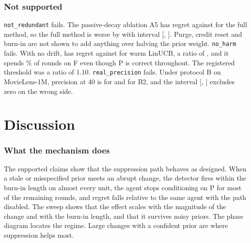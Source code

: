 \subsubsection*{Not supported}
\texttt{not\_redundant} fails. The passive-decay ablation A5 has regret \redRegretAfive{} against \redRegretDES{} for the full method, so the full method is worse by \redDiff{} with interval [\redLo, \redHi]. Purge, credit reset and burn-in are not shown to add anything over halving the prior weight. \texttt{no\_harm} fails. With no drift, \des{} has regret \harmRegretDES{} against \harmRegretBtwo{} for warm LinUCB, a ratio of \harmRatio{}, and it spends \harmFfraction\% of rounds on F even though P is correct throughout. The registered threshold was a ratio of 1.10. \texttt{real\_precision} fails. Under protocol B on MovieLens-1M, precision at 40 is \realPrecDES{} for \des{} and \realPrecBtwo{} for B2, and the interval [\realPrecLo, \realPrecHi] excludes zero on the wrong side.

\section{Discussion}
\label{sec:discussion}

\subsubsection*{What the mechanism does}
The supported claims show that the suppression path behaves as designed. When a stale or misspecified prior meets an abrupt change, the detector fires within the burn-in length on almost every unit, the agent stops conditioning on P for most of the remaining rounds, and regret falls relative to the same agent with the path disabled. The sweep shows that the effect scales with the magnitude of the change and with the burn-in length, and that it survives noisy priors. The phase diagram locates the regime. Large changes with a confident prior are where suppression helps most.

